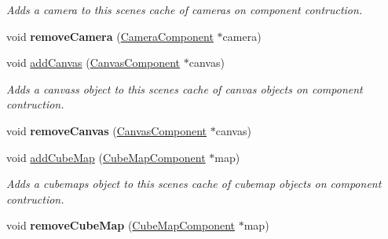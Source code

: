\begin{Indent}
\begin{DoxyCompactItemize}
\begin{DoxyCompactList}\small\item\em Adds a camera to this scene\textquotesingle{}s cache of cameras on component contruction. \end{DoxyCompactList}\item 
\mbox{\label{classrev_1_1_scene_a6faa5dad91774a08773fa081a3c5733d}} 
void {\bfseries remove\+Camera} (\mbox{\hyperlink{classrev_1_1_camera_component}{Camera\+Component}} $\ast$camera)
\item 
\mbox{\label{classrev_1_1_scene_ae889f6d5be111c5e373edd6b8aff9b66}} 
void \mbox{\hyperlink{classrev_1_1_scene_ae889f6d5be111c5e373edd6b8aff9b66}{add\+Canvas}} (\mbox{\hyperlink{classrev_1_1_canvas_component}{Canvas\+Component}} $\ast$canvas)
\begin{DoxyCompactList}\small\item\em Adds a canvas\textquotesingle{}s object to this scene\textquotesingle{}s cache of canvas objects on component contruction. \end{DoxyCompactList}\item 
\mbox{\label{classrev_1_1_scene_a79e627b538c3f890d4c18fefc2192f96}} 
void {\bfseries remove\+Canvas} (\mbox{\hyperlink{classrev_1_1_canvas_component}{Canvas\+Component}} $\ast$canvas)
\item 
\mbox{\label{classrev_1_1_scene_ad85589e15d7c958764e4ea08eb608baa}} 
void \mbox{\hyperlink{classrev_1_1_scene_ad85589e15d7c958764e4ea08eb608baa}{add\+Cube\+Map}} (\mbox{\hyperlink{classrev_1_1_cube_map_component}{Cube\+Map\+Component}} $\ast$map)
\begin{DoxyCompactList}\small\item\em Adds a cubemap\textquotesingle{}s object to this scene\textquotesingle{}s cache of cubemap objects on component contruction. \end{DoxyCompactList}\item 
\mbox{\label{classrev_1_1_scene_a07cb475a6c036754f33b9486d01b8579}} 
void {\bfseries remove\+Cube\+Map} (\mbox{\hyperlink{classrev_1_1_cube_map_component}{Cube\+Map\+Component}} $\ast$map)
\item 
\mbox{\label{classrev_1_1_scene_a899b4053b0b2aa5459c34b010af73e08}} 

\end{DoxyCompactItemize}
\end{Indent}
